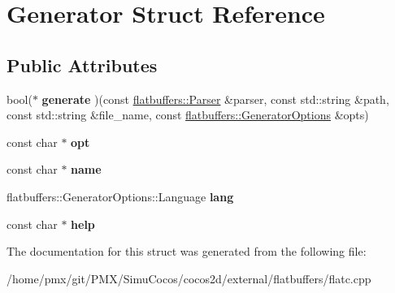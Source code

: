 \hypertarget{structGenerator}{}\section{Generator Struct Reference}
\label{structGenerator}
\subsection*{Public Attributes}
\begin{DoxyCompactItemize}
\item 
\mbox{\label{structGenerator_ade14e18673ede9ae15d110de8fb65a0f}} 
bool($\ast$ {\bfseries generate} )(const \hyperlink{classflatbuffers_1_1Parser}{flatbuffers\+::\+Parser} \&parser, const std\+::string \&path, const std\+::string \&file\+\_\+name, const \hyperlink{structflatbuffers_1_1GeneratorOptions}{flatbuffers\+::\+Generator\+Options} \&opts)
\item 
\mbox{\label{structGenerator_a7f84f1f6fd2751c7c563ef42cb1c0f26}} 
const char $\ast$ {\bfseries opt}
\item 
\mbox{\label{structGenerator_a94db4d77ad881e20cca4cf0d29202d4c}} 
const char $\ast$ {\bfseries name}
\item 
\mbox{\label{structGenerator_a201fdb0e5d1ff84b350954fb6816b706}} 
flatbuffers\+::\+Generator\+Options\+::\+Language {\bfseries lang}
\item 
\mbox{\label{structGenerator_a9a936f28be7e2f17a0ed72ea1f631952}} 
const char $\ast$ {\bfseries help}
\end{DoxyCompactItemize}


The documentation for this struct was generated from the following file\+:\begin{DoxyCompactItemize}
\item 
/home/pmx/git/\+P\+M\+X/\+Simu\+Cocos/cocos2d/external/flatbuffers/flatc.\+cpp\end{DoxyCompactItemize}
